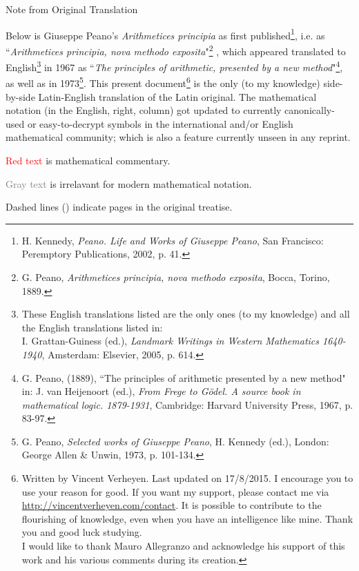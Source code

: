 \documentclass{book}
\newcommand\irrelavent[1]{\textcolor{gray}{#1}}
\begin{document}
%
\begin{paracol}{3}
  \switchcolumn[1] %

  { \Large Note from Original Translation}

   \vspace{0.25cm}
  
   Below is Giuseppe Peano's \emph{Arithmetices principia} as first published\footnote{H. Kennedy, \emph{Peano. Life and Works of Giuseppe Peano}, San Francisco: Peremptory Publications, 2002, p. 41.}, i.e. as ``\emph{Arithmetices principia, nova methodo exposita}"\footnote{G. Peano, \emph{Arithmetices principia, nova methodo exposita}, Bocca, Torino, 1889.} , which appeared translated to English\footnote{These English translations listed are the only ones (to my knowledge) and all the English translations listed in: \\
   I. Grattan-Guiness (ed.), \emph{Landmark Writings in Western Mathematics 1640-1940}, Amsterdam: Elsevier, 2005, p. 614.} in 1967 as ``\emph{The principles of arithmetic, presented by a new method}"\footnote{G. Peano, (1889), ``The principles of arithmetic presented by a new method" in: J. van Heijenoort (ed.), \emph{From Frege to G\"odel. A source book in mathematical logic. 1879-1931}, Cambridge: Harvard University Press, 1967, p. 83-97.}, as well as in 1973\footnote{G. Peano, \emph{Selected works of Giuseppe Peano}, H. Kennedy (ed.), London: George Allen \& Unwin, 1973, p. 101-134.}.
   This present document\footnote{Written by Vincent Verheyen. Last updated on 17/8/2015. I encourage you to use your reason for good. If you want my support, please contact me via \url{http://vincentverheyen.com/contact}. It is possible to contribute to the flourishing of knowledge, even when you have an intelligence like mine. Thank you and good luck studying. \\
   I would like to thank Mauro Allegranzo and acknowledge his support of this work and his various comments during its creation.} is the only (to my knowledge) side-by-side Latin-English translation of the Latin original.
   The mathematical notation (in the English, right, column) got updated to currently canonically-used or easy-to-decrypt symbols in the international and/or English mathematical community; which is also a feature currently unseen in any reprint.

   \vspace{1cm}
   
   \textcolor{red}{Red text} is mathematical commentary.

   \irrelavent{Gray text} is irrelavant for modern mathematical notation.

   Dashed lines (\hdashrule{2cm}{0.1mm}{0.1mm 1mm}) indicate pages in the original treatise.

   \vspace{1cm}
\end{paracol}
\newpage  
\end{document}
